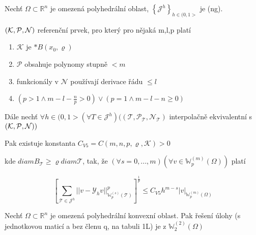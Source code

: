 \documentclass[../main.tex]{subfiles}
\begin{document}
\begin{theorem}[V5]
    Nechť $\Omega\subset\mathbb{R}^n$ je omezená polyhedrální oblast, $\left\{ \mathcal{J}^h \right\}_{h\in(0,1>}$ je (ng).

    $(\mathcal{K}, \mathcal{P}, \mathcal{N})$ referenční prvek, pro který pro nějaká m,l,p platí
    \begin{enumerate}
        \item $\mathcal{K}$ je $*B(x_0,\varrho)$
        \item $\mathcal{P}$ obsahuje polynomy stupně $< m$
        \item funkcionály v $\mathcal{N}$ používají derivace řádu $\leq l$
        \item $(p>1 \wedge m-l-\frac{n}{p} >0) \vee (p=1 \wedge m-l-n \geq 0)$
    \end{enumerate}

    Dále nechť $\forall h \in (0,1> (\forall T \in \mathcal{J}^h ) ( (\mathcal{T}, \mathcal{P}_\mathcal{T}, \mathcal{N}_\mathcal{T})$ interpolačně ekvivalentní s $(\mathcal{K}, \mathcal{P}, \mathcal{N}) )$

    Pak existuje konstanta $C_{V5} = C(m,n,p,\varrho,\mathcal{K}) > 0$

    kde $diam B_\mathcal{T} \geq \varrho diam \mathcal{T}$, tak, že $(\forall s = 0,...,m) (\forall v \in \mathbb{W}_p^{(m)}(\Omega))$ platí

    \begin{equation*}
        \left[  \sum_{\mathcal{T} \in \mathcal{J}^h} ||v - \mathcal{Y}_h v ||^p_{\mathbb{W}_p^{(s)}( \mathcal{T})}   \right]^\frac{1}{p}   \leq C_{V5} h^{m-s} |v|_{\mathbb{W}_p^{(m)} (\Omega) }
    \end{equation*}

\end{theorem}


\begin{claim}
    Nechť $\Omega\subset\mathbb{R}^n$ je omezená polyhedrální konvexní oblast. Pak řešení úlohy (s jednotkovou maticí a bez členu q, na tabuli 1L) je z $\mathbb{W}_2^{(2)}(\Omega)$

\end{claim}
\end{document}
